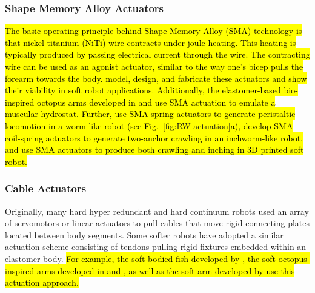 \subsubsection{Shape Memory Alloy Actuators}
\label{subsubsec:RW SMA}
\hl{The basic operating principle behind Shape Memory Alloy (SMA) technology is that nickel titanium (NiTi) wire contracts under joule heating.
This heating is typically produced by passing electrical current through the wire.
The contracting wire can be used as an agonist actuator, similar to the way one's bicep pulls the forearm towards the body.
\mbox{\citet{kim2009micro}} model, design, and fabricate these actuators and show their viability in soft robot applications.
Additionally, the elastomer-based bio-inspired octopus arms developed in \mbox{\citet{laschi2012soft}} and \mbox{\citet{cianchetti2014bioinspired}} use SMA actuation to emulate a muscular hydrostat.
Further, \mbox{\citet{seok2010peristaltic}} use SMA spring actuators to generate peristaltic locomotion in a worm-like robot (see Fig.~\mbox{\ref{fig:RW actuation}}a), \mbox{\citet{koh2013omega}} develop SMA coil-spring actuators to generate two-anchor crawling in an inchworm-like robot, and \mbox{\citet{umedachi2013highly}} use SMA actuators to produce both crawling and inching in 3D printed soft robot.}


\subsubsection{Cable Actuators}
\label{subsubsec:RW Cables}
Originally, many hard hyper redundant and hard continuum robots \citep{cieslak1999elephant, buckingham2002snake, gravagne2002uniform, hannan2003kinematics, mcmahan2005design, camarillo2009configuration} used an array of servomotors or linear actuators to pull cables that move rigid connecting plates located between body segments.
Some softer robots have adopted a similar actuation scheme consisting of tendons pulling rigid fixtures embedded within an elastomer body.
\hl{For example, the soft-bodied fish developed by \mbox{\citet{youcef2006design}}, the soft octopus-inspired arms developed in \mbox{\citet{calisti2010study}} and \mbox{\citet{calisti2011octopus}}, as well as the soft arm developed by \mbox{\citet{wang2013visual}} use this actuation approach.}

